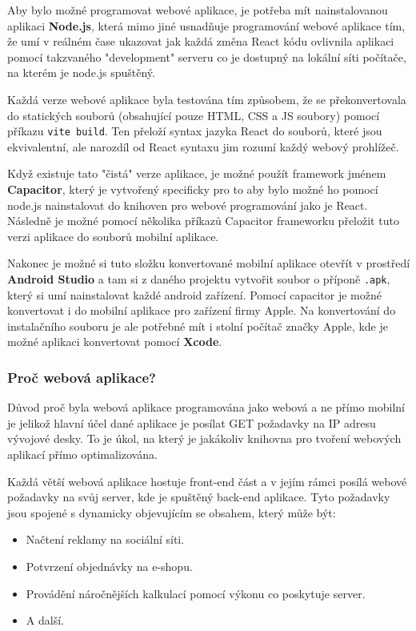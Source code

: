 Aby bylo možné programovat webové aplikace, je potřeba mít nainstalovanou aplikaci \textbf{Node.js}, která mimo jiné usnadňuje programování webové aplikace tím, že umí v reálném čase ukazovat jak každá změna React kódu ovlivnila aplikaci pomocí takzvaného "development" serveru co je dostupný na lokální síti počítače, na kterém je node.js spuštěný.

Každá verze webové aplikace byla testována tím způsobem, že se překonvertovala do statických souborů (obsahující pouze HTML, CSS a JS soubory) pomocí příkazu \texttt{vite build}. Ten přeloží syntax jazyka React do souborů, které jsou ekvivalentní, ale narozdíl od React syntaxu jim rozumí každý webový prohlížeč.

Když existuje tato "čistá" verze aplikace, je možné použít framework jménem \textbf{Capacitor}, který je vytvořený specificky pro to aby bylo možné ho pomocí node.js nainstalovat do knihoven pro webové programování jako je React. Následně je možné pomocí několika příkazů Capacitor frameworku přeložit tuto verzi aplikace do souborů mobilní aplikace.
\cite{CapacitorDocs}

Nakonec je možné si tuto složku konvertované mobilní aplikace otevřít v prostředí \textbf{Android Studio} a tam si z daného projektu vytvořit soubor o příponě \texttt{.apk}, který si umí nainstalovat každé android zařízení. Pomocí capacitor je možné konvertovat i do mobilní aplikace pro zařízení firmy Apple. Na konvertování do instalačního souboru je ale potřebné mít i stolní počítač značky Apple, kde je možné aplikaci konvertovat pomocí \textbf{Xcode}.

\subsubsection{Proč webová aplikace?}
Důvod proč byla webová aplikace programována jako webová a ne přímo mobilní je jelikož hlavní účel dané aplikace je posílat GET požadavky na IP adresu vývojové desky. To je úkol, na který je jakákoliv knihovna pro tvoření webových aplikací přímo optimalizována.

Každá větší webová aplikace hostuje front-end část a v jejím rámci posílá webové požadavky na svůj server, kde je spuštěný back-end aplikace. Tyto požadavky jsou spojené s dynamicky objevujícím se obsahem, který může být:
\begin{itemize}
	\item Načtení reklamy na sociální síti.
	\item Potvrzení objednávky na e-shopu.
	\item Provádění náročnějších kalkulací pomocí výkonu co poskytuje server.
	\item A další.
\end{itemize}


